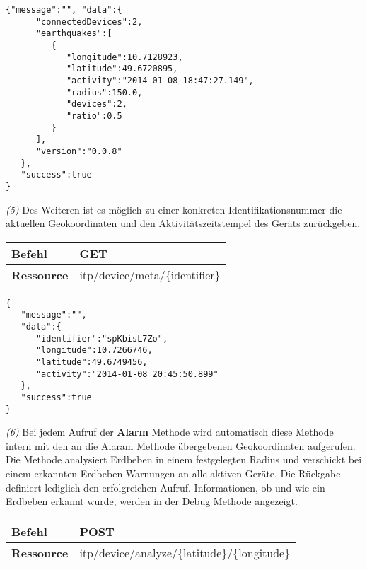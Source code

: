\begin{lstlisting}[caption={Rückgabe}]
{"message":"", "data":{
      "connectedDevices":2,
      "earthquakes":[
         {
            "longitude":10.7128923,
            "latitude":49.6720895,
            "activity":"2014-01-08 18:47:27.149",
            "radius":150.0,
            "devices":2,
            "ratio":0.5
         }
      ],
      "version":"0.0.8"
   },
   "success":true
}

\end{lstlisting} 

\textit{(5)} Des Weiteren ist es möglich zu einer konkreten Identifikationsnummer die aktuellen Geokoordinaten und den Aktivitätszeitstempel des Geräts zurückgeben.

\begin{table}[!htb] 
    \begin{tabular}{l|l}
    \textbf{Befehl}    & GET                                          \\ \hline
    \textbf{Ressource} & itp/device/meta/\{identifier\} \\ 
    \end{tabular}
\end{table}

\begin{lstlisting}[caption={Rückgabe}]
{
   "message":"",
   "data":{
      "identifier":"spKbisL7Zo",
      "longitude":10.7266746,
      "latitude":49.6749456,
      "activity":"2014-01-08 20:45:50.899"
   },
   "success":true
}
\end{lstlisting} 

\textit{(6)} Bei jedem Aufruf der \textbf{Alarm} Methode wird automatisch diese Methode intern mit den an die Alaram Methode übergebenen Geokoordinaten aufgerufen. Die Methode analysiert Erdbeben in einem festgelegten Radius und verschickt bei einem erkannten Erdbeben Warnungen an alle aktiven Geräte. Die Rückgabe definiert lediglich den erfolgreichen Aufruf. Informationen, ob und wie ein Erdbeben erkannt wurde, werden in der Debug Methode angezeigt.

\begin{table}[!htb] 
    \begin{tabular}{l|l}
    \textbf{Befehl}    & POST                                          \\ \hline
    \textbf{Ressource} & itp/device/analyze/\{latitude\}/\{longitude\} \\ 
    \end{tabular}
\end{table}


